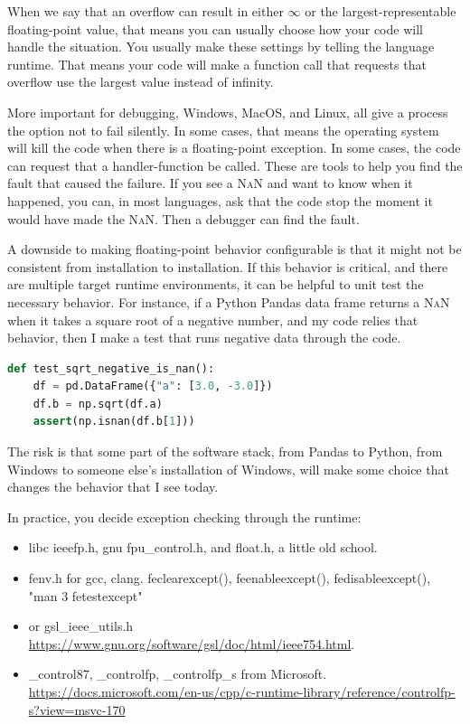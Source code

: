 \documentclass[fleqn,10pt]{olplainarticle}
\newcommand{\nan}{\textsc{NaN}\xspace}
\begin{document}
When we say that an overflow can result in either $\infty$ or
the largest-representable floating-point value, that means you can
usually choose how your code will handle the situation. You usually
make these settings by telling the language runtime. That means your
code will make a function call that requests that overflow use the
largest value instead of infinity.

More important for debugging, Windows, MacOS, and Linux, all give
a process the option not to fail silently. In some cases, that means
the operating system will kill the code when there is a floating-point
exception. In some cases, the code can request that a handler-function
be called. These are tools to help you find the fault that caused the
failure. If you see a \nan and want to know when it happened, you can,
in most languages, ask that the code stop the moment it would have made
the \nan. Then a debugger can find the fault.

A downside to making floating-point behavior configurable is that
it might not be consistent from installation to installation.
If this behavior is critical, and there are multiple target runtime
environments, it can be helpful to unit test the necessary behavior.
For instance, if a Python Pandas data frame returns a \nan when it
takes a square root of a negative number, and my code relies that behavior,
then I make a test that runs negative data through the code.
\begin{lstlisting}[language=Python]
def test_sqrt_negative_is_nan():
    df = pd.DataFrame({"a": [3.0, -3.0]})
    df.b = np.sqrt(df.a)
    assert(np.isnan(df.b[1]))
\end{lstlisting}
The risk is that some part of the software stack, from Pandas to Python, from
Windows to someone else's installation of Windows,
will make some choice that changes the behavior that I see today.

In practice, you decide exception checking through the runtime:
\begin{itemize}
    \item libc ieeefp.h, gnu fpu_control.h, and float.h, a little old school.
    \item fenv.h for gcc, clang. feclearexcept(), feenableexcept(), fedisableexcept(), "man 3 fetestexcept"
    \item or gsl_ieee_utils.h \url{https://www.gnu.org/software/gsl/doc/html/ieee754.html}.
    \item _control87, _controlfp, _controlfp_s from Microsoft. \url{https://docs.microsoft.com/en-us/cpp/c-runtime-library/reference/controlfp-s?view=msvc-170}
\end{itemize}
\end{document}

